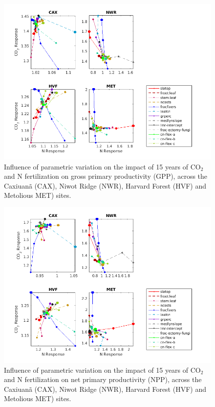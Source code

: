 \documentclass[draft,linenumbers]{agujournal}
\begin{document}
 \begin{figure}[h]
     \centering
     \includegraphics[width=1.55\textwidth, left]{matlab/figures/NOVc_CNdep_GPP1__p2012.png}
     \caption{Influence of parametric variation on the impact of 15 years of CO$_{2}$ and N fertilization on gross primary productivity (GPP), across the Caxiuan\~a (CAX), Niwot Ridge (NWR), Harvard Forest (HVF) and Metolious MET) sites. }
     \label{GPP CO2 and N respones 2001}
  \end{figure}
  
 \begin{figure}[h]
     \centering
     \includegraphics[width=1.55\textwidth, left]{matlab/figures/NOVc_CNdep_NPP1__p2012.png}
     \caption{Influence of parametric variation on the impact of 15 years of CO$_{2}$ and N fertilization on net primary productivity (NPP), across the Caxiuan\~a (CAX), Niwot Ridge (NWR), Harvard Forest (HVF) and Metolious MET) sites.}
     \label{NPP CO2 and N respones 2001}
  \end{figure}
  
\end{document}
